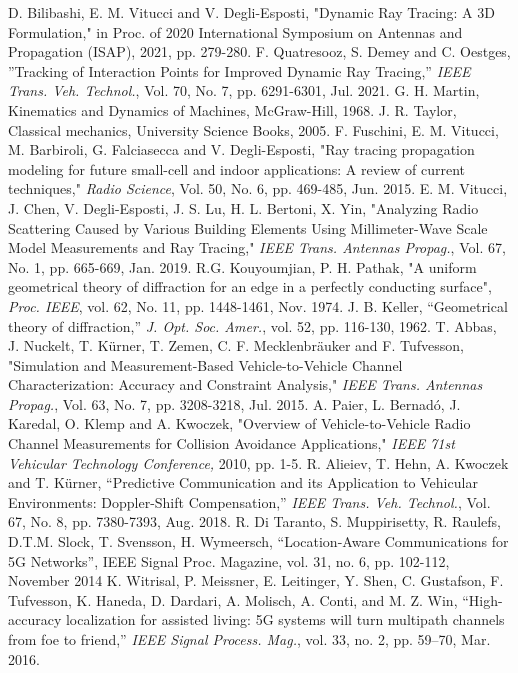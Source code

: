 \begin{thebibliography}{}
    D. Bilibashi, E. M. Vitucci and V. Degli-Esposti, "Dynamic Ray Tracing: A 3D Formulation," in Proc. of 2020 International Symposium on Antennas and Propagation (ISAP), 2021, pp. 279-280.
    F. Quatresooz, S. Demey and C. Oestges, ”Tracking of Interaction Points for Improved Dynamic Ray Tracing,” \textit{IEEE Trans. Veh. Technol.}, Vol. 70, No. 7, pp. 6291-6301, Jul. 2021.
    G. H. Martin, Kinematics and Dynamics of Machines, McGraw-Hill, 1968.
    J. R. Taylor, Classical mechanics, University Science Books, 2005.
    F. Fuschini, E. M. Vitucci, M. Barbiroli, G. Falciasecca and V. Degli-Esposti, "Ray tracing propagation modeling for future small-cell and indoor applications: A review of current techniques," \textit {Radio Science}, Vol. 50, No. 6, pp. 469-485, Jun. 2015.
    E. M. Vitucci, J. Chen, V. Degli-Esposti, J. S. Lu, H. L. Bertoni, X. Yin, "Analyzing Radio Scattering Caused by Various Building Elements Using Millimeter-Wave Scale Model Measurements and Ray Tracing," \textit{IEEE Trans. Antennas Propag.}, Vol. 67, No. 1, pp. 665-669, Jan. 2019.
    R.G. Kouyoumjian, P. H. Pathak, "A uniform geometrical theory of diffraction for an edge in a perfectly conducting surface", \textit{Proc. IEEE}, vol. 62, No. 11, pp. 1448-1461, Nov. 1974. 
    J. B. Keller, “Geometrical theory of diffraction,” \textit{J. Opt. Soc. Amer.}, vol. 52, pp. 116-130, 1962.
    T. Abbas, J. Nuckelt, T. Kürner, T. Zemen, C. F. Mecklenbräuker and F. Tufvesson, "Simulation and Measurement-Based Vehicle-to-Vehicle Channel Characterization: Accuracy and Constraint Analysis," \textit{IEEE Trans. Antennas Propag.}, Vol. 63, No. 7, pp. 3208-3218, Jul. 2015.
    A. Paier, L. Bernadó, J. Karedal, O. Klemp and A. Kwoczek, "Overview of Vehicle-to-Vehicle Radio Channel Measurements for Collision Avoidance Applications," \textit{IEEE 71st Vehicular Technology Conference,} 2010, pp. 1-5.
    R. Alieiev, T. Hehn, A. Kwoczek and T. Kürner, “Predictive Communication and its Application to Vehicular Environments: Doppler-Shift Compensation,” \textit{IEEE Trans. Veh. Technol.}, Vol. 67, No. 8, pp. 7380-7393, Aug. 2018.
    R. Di Taranto, S. Muppirisetty, R. Raulefs, D.T.M. Slock, T. Svensson, H. Wymeersch, “Location-Aware Communications for 5G Networks”, IEEE Signal Proc. Magazine, vol. 31, no. 6, pp. 102-112, November 2014
    K. Witrisal, P. Meissner, E. Leitinger, Y. Shen, C. Gustafson, F. Tufvesson, K. Haneda, D. Dardari, A. Molisch, A. Conti, and M. Z. Win, “High-accuracy localization for assisted living: 5G systems will turn multipath channels from foe to friend,” \textit{IEEE Signal Process. Mag.}, vol. 33, no. 2, pp. 59–70, Mar. 2016.

\end{thebibliography}
